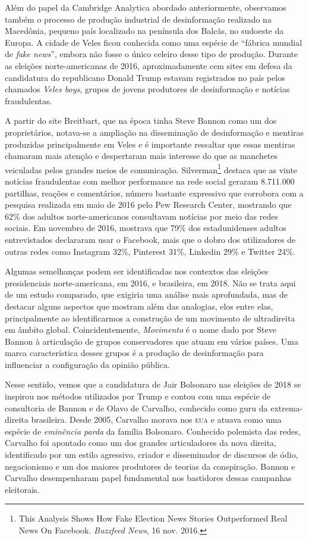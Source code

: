 Além do papel da Cambridge Analytica abordado anteriormente, observamos
também o processo de produção industrial de desinformação realizado na
Macedônia, pequeno país localizado na península dos Balcãs, no sudoeste
da Europa. A cidade de Veles ficou conhecida como uma espécie de
``fábrica mundial de \textit{fake news}'', embora não fosse o único
celeiro desse tipo de produção. Durante as eleições norte-americanas de 2016,
aproximadamente cem sites em defesa da candidatura do republicano Donald
Trump estavam registrados no país pelos chamados \textit{Veles boys}, grupos de
jovens produtores de desinformação e notícias fraudulentas.

A partir do site Breitbart, que na época tinha Steve Bannon como um dos
proprietários, notava-se a ampliação na disseminação de desinformação e
mentiras produzidas principalmente em Veles e é importante ressaltar que
essas mentiras chamaram mais atenção e despertaram mais interesse do que
as manchetes veiculadas pelos grandes meios de comunicação. Silverman\footnote{This Analysis Shows How Fake Election News
Stories Outperformed Real News On Facebook. \textit{Buzzfeed News}, 16 nov. 2016.}
destaca que as vinte notícias fraudulentas com melhor performance
na rede social geraram 8.711.000 partilhas, reações e comentários,
número bastante expressivo que corrobora com a pesquisa realizada em
maio de 2016 pelo Pew Research Center, mostrando que 62\% dos adultos
norte-americanos consultavam notícias por meio das redes sociais. Em novembro
de 2016, mostrava que 79\% dos estadunidenses adultos entrevistados
declararam usar o Facebook, mais que o dobro dos utilizadores de outras
redes como Instagram 32\%, Pinterest 31\%, Linkedin 29\% e Twitter 24\%.

Algumas semelhanças podem ser identificadas nos contextos das eleições
presidenciais norte-americana, em 2016, e brasileira, em 2018. Não se trata aqui
de um estudo comparado, que exigiria uma análise mais aprofundada, mas de
destacar alguns aspectos que mostram além das analogias, elos entre
elas, principalmente ao identificarmos a construção de um movimento de
ultradireita em âmbito global. Coincidentemente, \textit{Movimento} é o nome dado
por Steve Bannon à articulação de grupos conservadores que atuam em
vários países. Uma marca característica desses grupos é a produção de
desinformação para influenciar a configuração da opinião pública.

Nesse sentido, vemos que a candidatura de Jair Bolsonaro nas eleições de
2018 se inspirou nos métodos utilizados por Trump e contou com uma
espécie de consultoria de Bannon e de Olavo de Carvalho, conhecido como
guru da extrema-direita brasileira. Desde 2005, Carvalho morava nos \textsc{eua}
e atuava como uma espécie de \textit{eminência parda} da família Bolsonaro.
Conhecido polemista das redes, Carvalho foi apontado como um dos grandes
articuladores da nova direita, identificado por um estilo agressivo,
criador e disseminador de discursos de ódio, negacionismo e um dos
maiores produtores de teorias da conspiração. Bannon e Carvalho
desempenharam papel fundamental nos bastidores dessas campanhas
eleitorais.

